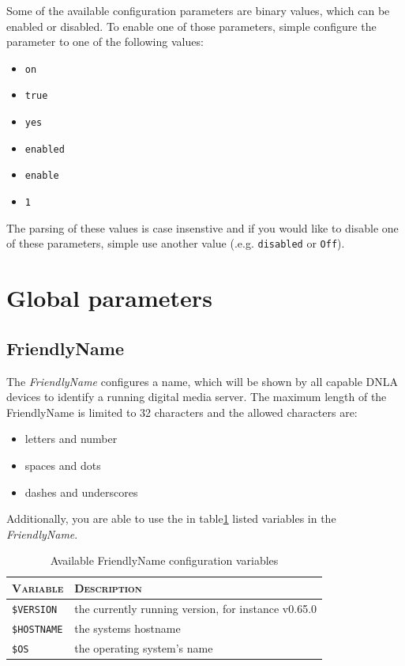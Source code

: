 \documentclass[a4paper,oneside,10pt]{report}
\newcommand{\pDLNAversion}{0.65.0}
\begin{document}
Some of the available configuration parameters are binary values, which can be enabled or disabled. To enable one of those parameters, simple configure the parameter to one of the following values:
\begin{itemize}
	\item \verb|on|
	\item \verb|true|
	\item \verb|yes|
	\item \verb|enabled|
	\item \verb|enable|
	\item \verb|1|
\end{itemize}
The parsing of these values is case insenstive and if you would like to disable one of these parameters, simple use another value (.e.g. \verb|disabled| or \verb|Off|).

\section{Global parameters}

\subsection{FriendlyName}

The {\em FriendlyName} configures a name, which will be shown by all capable DNLA devices to identify a running digital media server. The maximum length of the {FriendlyName} is limited to 32 characters and the allowed characters are:
\begin{itemize}
	\item letters and number
	\item spaces and dots
	\item dashes and underscores
\end{itemize}

Additionally, you are able to use the in table\ref{tab:AvailableFriendlyNameVariables} listed variables in the {\em FriendlyName}.

\begin{table}
	\centering
	\begin{tabular}{|p{7em}|p{25em}|}
		\hline
		\textsc{Variable} 	& \textsc{Description}\\
		\hline
		\hline
		\verb|$VERSION| 		& the currently running version, for instance v\pDLNAversion \\
		\hline
		\verb|$HOSTNAME| 		& the systems hostname \\
		\hline
		\verb|$OS| 					& the operating system's name \\
		\hline
	\end{tabular}
	\caption{Available FriendlyName configuration variables}
	\label{tab:AvailableFriendlyNameVariables}
\end{table}
\end{document}

